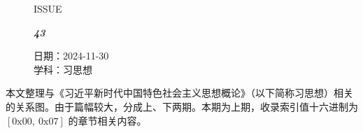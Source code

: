 \documentclass[UTF8]{ctexart}
\newcommand\Black[1]{\textcolor[gray]{0.3}{#1}}
\newcommand\Brown[1]{\textcolor[HTML]{998A4E}{#1}}
\newcommand\IssueNumber{43}
\newcommand\Date{2024-11-30}
\newcommand\Subject{习思想}
\begin{document}
\begin{figure}[H]
\hspace{1cm}
\begin{minipage}[t]{0.3\textwidth}
\centering
    \Brown{\Genshin ISSUE}

    \vspace{-0.6cm}
    \Huge \Issue\slshape\bfseries\Black{\IssueNumber}
\end{minipage}
\hfill
\begin{minipage}[t]{0.3\textwidth}
\centering
    \Brown{日期：\Date} \\
\vspace{-0.1cm}
    \Brown{学科：\Subject} \\
\end{minipage}
\hspace{0.8cm}
\end{figure}

{\color{darkcyan}
本文整理与《习近平新时代中国特色社会主义思想概论》（以下简称习思想）相关的关系图。由于篇幅较大，分成上、下两期。本期为上期，收录索引值十六进制为 $\mathrm{[0x00,\  0x07]}$ 的章节相关内容。
}
\end{document}

